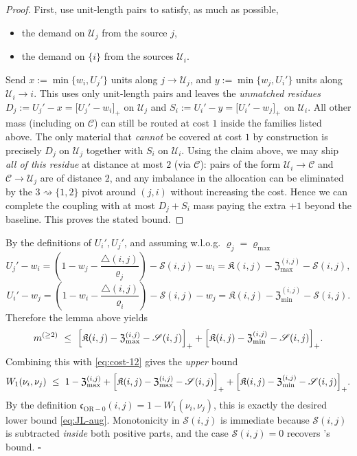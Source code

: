 \documentclass[twoside,11pt]{article}
\numberwithin{equation}{section}
\numberwithin{theorem}{section}
\numberwithin{example}{section}
\begin{document}
\begin{proof}
First, use unit-length pairs to satisfy, as much as possible,
\begin{itemize}
\item[(i)] the demand on $\mathcal U_j$ from the source $j$,
\item[(ii)] the demand on $\{i\}$ from the sources $\mathcal U_i$.
\end{itemize}
Send $x:=\min\{w_i,U_j'\}$ units along $j\to\mathcal U_j$, and
$y:=\min\{w_j,U_i'\}$ units along $\mathcal U_i\to i$.
This uses only unit-length pairs and leaves the \emph{unmatched residues} $D_j:=U_j'-x=\bigl[U_j'-w_i\bigr]_+$ on $\mathcal U_j$ and $S_i:=U_i'-y=\bigl[U_i'-w_j\bigr]_+$ on $\mathcal U_i$.
All other mass (including on $\mathcal C$) can still be routed at cost $1$ inside the families listed above. The only material that \emph{cannot} be covered
at cost $1$ by construction is precisely $D_j$ on $\mathcal U_j$ together with $S_i$
on $\mathcal U_i$. Using the claim above, we may ship \emph{all of this residue}
at distance at most $2$ (via $\mathcal C$): pairs of the form $\mathcal U_i\to\mathcal C$ and $\mathcal C\to\mathcal U_j$ are of distance $2$, and any imbalance in the allocation can be eliminated by the $3\rightsquigarrow\{1,2\}$ pivot around $(j,i)$ without increasing the cost. Hence we can complete the coupling with at most $D_j+S_i$
mass paying the extra $+1$ beyond the baseline. This proves the stated bound.
\end{proof}
By the definitions of $U_i',U_j'$, and assuming w.l.o.g. $\varrho_j=\varrho_{\max}$
\[
U_j'-w_i
=\left(1-w_j-\frac{\triangle(i,j)}{\varrho_j}\right)-\mathscr S(i,j)-w_i
=\mathfrak K(i,j)-\mathfrak Z_{\max}^{(i,j)}-\mathscr S(i,j),
\]
\[
U_i'-w_j
=\left(1-w_i-\frac{\triangle(i,j)}{\varrho_i}\right)-\mathscr S(i,j)-w_j
=\mathfrak K(i,j)-\mathfrak Z_{\min}^{(i,j)}-\mathscr S(i,j).
\]
Therefore the lemma above yields
\[
m^{(\ge 2)}
\ \le\
\Bigl[\mathfrak K(i,j)-\mathfrak Z^{(i,j)}_{\max}-\mathscr S(i,j)\Bigr]_+
+\Bigl[\mathfrak K(i,j)-\mathfrak Z^{(i,j)}_{\min}-\mathscr S(i,j)\Bigr]_+.
\]
Combining this with \eqref{eq:cost-12} gives the \emph{upper} bound
\[
W_1(\nu_i,\nu_j)
\ \le\
1-\mathfrak Z_{\max}^{(i,j)}
+\Bigl[\mathfrak K(i,j)-\mathfrak Z^{(i,j)}_{\max}-\mathscr S(i,j)\Bigr]_+
+\Bigl[\mathfrak K(i,j)-\mathfrak Z^{(i,j)}_{\min}-\mathscr S(i,j)\Bigr]_+.
\]
By the definition $\mathfrak c_{\mathrm{OR}-0}(i,j)=1-W_1(\nu_i,\nu_j)$, this is exactly the desired lower bound \eqref{eq:JL-aug}. Monotonicity in $\mathscr S(i,j)$ is immediate because $\mathscr S(i,j)$ is subtracted \emph{inside} both positive parts, and the case $\mathscr S(i,j)=0$ recovers \citeauthor{jost_clustering_2014}'s bound.
\hfill $\square$
\end{document}
